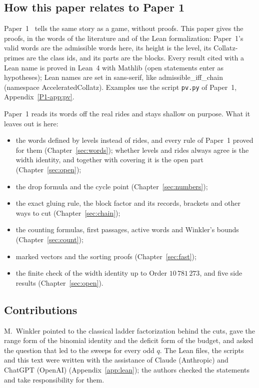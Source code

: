 \documentclass[10pt,a4paper,titlepage]{article}
\newif\ifpaper
\newcommand{\lean}[1]{\textsf{#1}}
\begin{document}
\ifpaper\clearpage\fi
\subsection*{How this paper relates to Paper 1}

Paper~1~\cite{Paper1} tells the same story as a game, without proofs. This paper
gives the proofs, in the words of the literature and of the Lean formalization:
Paper~1's valid words are the admissible words here, its height is the level, its
Collatz-primes are the class ids, and its parts are the blocks. Every result cited with a Lean name is
proved in Lean~4 with Mathlib (open statements enter as hypotheses); Lean names are set in sans-serif, like
\lean{admissible\_iff\_chain} (namespace \lean{AcceleratedCollatz}). Examples use
the script \texttt{pv.py} of Paper~1, Appendix~\ref{P1-app:pv}.

Paper~1 reads its words off the real rides and stays shallow on purpose. What it
leaves out is here:
{\samepage
\begin{itemize}
\item the words defined by levels instead of rides, and every rule of Paper~1 proved
  for them (Chapter~\ref{sec:words}); whether levels and rides always agree is the
  width identity, and together with covering it is the open part
  (Chapter~\ref{sec:open});
\item the drop formula and the cycle point (Chapter~\ref{sec:numbers});
\item the exact gluing rule, the block factor and its records, brackets and other ways
  to cut (Chapter~\ref{sec:chain});
\item the counting formulas, first passages, active words and Winkler's bounds
  (Chapter~\ref{sec:count});
\item marked vectors and the sorting proofs (Chapter~\ref{sec:fast});
\item the finite check of the width identity up to Order $10\,781\,273$, and five side
  results (Chapter~\ref{sec:open}).
\end{itemize}}

\subsection*{Contributions}

M.~Winkler pointed to the classical ladder factorization behind the cuts, gave the
range form of the binomial identity and the deficit form of the budget, and asked the
question that led to the sweeps for every odd $q$. The Lean files, the scripts and
this text were written with the assistance of Claude (Anthropic) and ChatGPT (OpenAI)
(Appendix~\ref{app:lean}); the authors checked the statements and take
responsibility for them.
\end{document}
